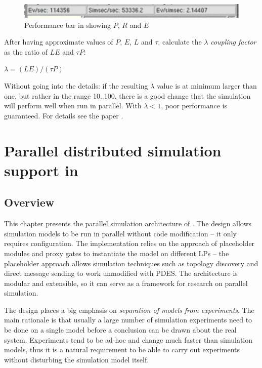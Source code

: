 \begin{figure}[htbp]
  \begin{center}
    \includegraphics{figures/perfbar-screenshot}
    \caption{Performance bar in {\opp} showing $P$, $R$ and $E$}
    \label{fig:perfbar-screenshot}
  \end{center}
\end{figure}

After having approximate values of $P$, $E$, $L$ and $\tau$,
calculate the $\lambda$ \textit{coupling factor} as the ratio of $LE$ and $\tau P$:

$\lambda = (LE) / (\tau P)$

Without going into the details: if the resulting $\lambda$ value is at
minimum larger than one, but rather in the range 10..100, there is
a good change that the simulation will perform well when run in
parallel. With $\lambda < 1$, poor performance is guaranteed.
For details see the paper \cite{FIXME}.


\section{Parallel distributed simulation support in {\opp}}

\subsection{Overview}

This chapter presents the parallel simulation architecture
of {\opp}. The design allows simulation models to be run
in parallel without code modification -- it only requires configuration.
The implementation relies on the approach of placeholder modules
and proxy gates to instantiate the model on different LPs --
the placeholder approach allows simulation techniques such as
topology discovery and direct message sending to work unmodified with
PDES. The architecture is modular and extensible, so it can
serve as a framework for research on parallel simulation.

The {\opp} design places a big emphasis on
\textit{separation of models from experiments}. The main rationale
is that usually a large number of simulation experiments need to be done
on a single model before a conclusion can be drawn about the real system.
Experiments tend to be ad-hoc and change much faster than simulation
models, thus it is a natural requirement to be able to
carry out experiments without disturbing the simulation model itself.

